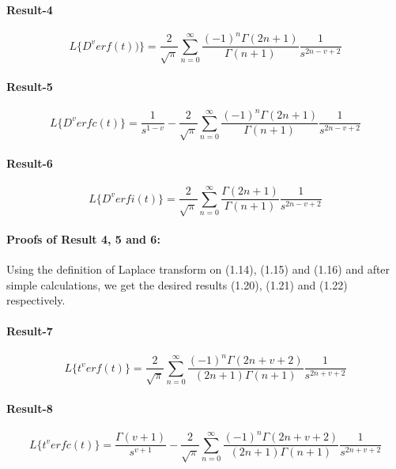 \documentclass{article}
\begin{document}
\paragraph{Result-4}
\begin{equation}
    L\big\{{D^v}erf(t))\big\} = 
    \frac{2}{\sqrt{\pi}}
    \sum_{n = 0}^{\infty}
    \frac{{(-1)}^n\Gamma{(2n+1)}}{\Gamma{(n+1)}}
    \frac{1}{s^{2n-v+2}}
\end{equation}
\paragraph{Result-5}
\begin{equation}
    L \big\{ D^v erfc(t) \big\} = 
    \frac{1}{s^{1-v}}-
    \frac{2}{\sqrt{\pi}}
    \sum_{n = 0}^{\infty}
    \frac{{(-1)}^n\Gamma{(2n+1)}}{\Gamma{(n+1)}}
    \frac{1}{s^{2n-v+2}}
\end{equation}
\paragraph{Result-6}
\begin{equation}
    L\big\{{D^v}erfi(t)\big\} = 
    \frac{2}{\sqrt{\pi}}
    \sum_{n = 0}^{\infty}
    \frac{\Gamma{(2n+1)}}{\Gamma{(n+1)}}
    \frac{1}{s^{2n-v+2}}
\end{equation}
\paragraph{Proofs of Result 4, 5 and 6:}
Using the definition of Laplace transform on (1.14), (1.15) and (1.16) and after simple calculations, we get the desired results (1.20), (1.21) and (1.22) respectively.

\paragraph{Result-7}
\begin{equation}
    L\big\{{t^v}erf(t)\big\} = 
    \frac{2}{\sqrt{\pi}}
    \sum_{n = 0}^{\infty}
    \frac{{(-1)}^n\Gamma{(2n+v+2)}}{(2n+1)\Gamma{(n+1)}}
    \frac{1}{s^{2n+v+2}}
\end{equation}
\paragraph{Result-8\\}
\begin{equation}
    L\big\{{t^v}erfc(t)\big\}=
    \frac{\Gamma{(v+1)}}{s^{v+1}}
    -\frac{2}{\sqrt{\pi}}
    \sum_{n = 0}^{\infty}
    \frac{{(-1)}^n\Gamma{(2n+v+2)}}{(2n+1)\Gamma{(n+1)}}
    \frac{1}{s^{2n+v+2}}
\end{equation}
\end{document}
